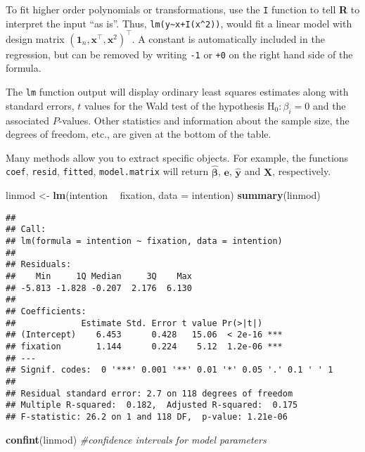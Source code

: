 \documentclass[
]{book}
\newenvironment{Shaded}{\begin{snugshade}}{\end{snugshade}}
\newcommand{\CommentTok}[1]{\textcolor[rgb]{0.56,0.35,0.01}{\textit{#1}}}
\newcommand{\DataTypeTok}[1]{\textcolor[rgb]{0.13,0.29,0.53}{#1}}
\newcommand{\KeywordTok}[1]{\textcolor[rgb]{0.13,0.29,0.53}{\textbf{#1}}}
\newcommand{\NormalTok}[1]{#1}
\newcommand{\OperatorTok}[1]{\textcolor[rgb]{0.81,0.36,0.00}{\textbf{#1}}}
\newcommand{\StringTok}[1]{\textcolor[rgb]{0.31,0.60,0.02}{#1}}
\begin{document}
To fit higher order polynomials or transformations, use the \texttt{I} function to tell \textbf{R} to interpret the input ``as is''.
Thus, \texttt{lm(y\textasciitilde{}x+I(x\^{}2))}, would fit a linear model with design matrix \((\boldsymbol{1}_n, \mathbf{x}^\top, \mathbf{x}^2)^\top\). A constant is automatically included in the regression, but can be removed by writing \texttt{-1} or \texttt{+0} on the right hand side of the formula.

The \texttt{lm} function output will display ordinary least squares estimates along with standard errors, \(t\) values for the Wald test of the hypothesis \(\mathrm{H}_0: \beta_i=0\) and the associated \(P\)-values. Other statistics and information about the sample size, the degrees of freedom, etc., are given at the bottom of the table.

Many methods allow you to extract specific objects. For example, the functions \texttt{coef}, \texttt{resid}, \texttt{fitted}, \texttt{model.matrix} will return \(\widehat{\boldsymbol{\beta}}\), \(\boldsymbol{e}\), \(\widehat{\boldsymbol{y}}\) and \(\mathbf{X}\), respectively.

\begin{Shaded}
\begin{Highlighting}[]
\NormalTok{linmod <-}\StringTok{ }\KeywordTok{lm}\NormalTok{(intention }\OperatorTok{~}\StringTok{ }\NormalTok{fixation, }\DataTypeTok{data =}\NormalTok{ intention)}
\KeywordTok{summary}\NormalTok{(linmod)}
\end{Highlighting}
\end{Shaded}

\begin{verbatim}
## 
## Call:
## lm(formula = intention ~ fixation, data = intention)
## 
## Residuals:
##    Min     1Q Median     3Q    Max 
## -5.813 -1.828 -0.207  2.176  6.130 
## 
## Coefficients:
##             Estimate Std. Error t value Pr(>|t|)    
## (Intercept)    6.453      0.428   15.06  < 2e-16 ***
## fixation       1.144      0.224    5.12  1.2e-06 ***
## ---
## Signif. codes:  0 '***' 0.001 '**' 0.01 '*' 0.05 '.' 0.1 ' ' 1
## 
## Residual standard error: 2.7 on 118 degrees of freedom
## Multiple R-squared:  0.182,  Adjusted R-squared:  0.175 
## F-statistic: 26.2 on 1 and 118 DF,  p-value: 1.21e-06
\end{verbatim}

\begin{Shaded}
\begin{Highlighting}[]
\KeywordTok{confint}\NormalTok{(linmod) }\CommentTok{#confidence intervals for model parameters}
\end{Highlighting}
\end{Shaded}
\end{document}
